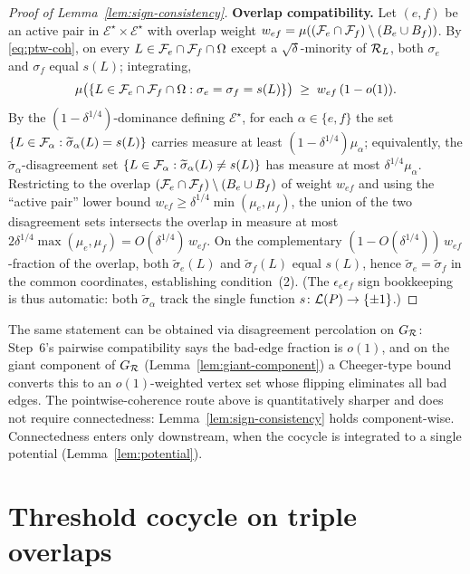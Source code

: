 \begin{proof}[Proof of Lemma~\ref{lem:sign-consistency}]
\textbf{Overlap compatibility.}
Let $(e,f)$ be an active pair in $\mathcal{E}^\star\times
\mathcal{E}^\star$ with overlap weight
$w_{ef}=\mu((\mathcal{F}_{e}\cap\mathcal{F}_{f})\setminus(B_e\cup B_f))$.
By \eqref{eq:ptw-coh}, on every $L\in\mathcal{F}_{e}\cap\mathcal{F}_{f}\cap\Omega$
except a $\sqrt{\delta}$-minority of $\mathcal{R}_L$, both $\sigma_e$ and
$\sigma_f$ equal $s(L)$; integrating,
\[
  \mu\bigl(\{L\in\mathcal{F}_{e}\cap\mathcal{F}_{f}\cap\Omega:
      \sigma_e=\sigma_f=s(L)\}\bigr)
  \;\ge\; w_{ef}\,(1-o(1)).
\]
By the $(1-\delta^{1/4})$-dominance defining $\mathcal{E}^\star$, for
each $\alpha\in\{e,f\}$ the set
$\{L\in\mathcal{F}_{\alpha}:\widetilde\sigma_\alpha(L)=s(L)\}$ carries
measure at least $(1-\delta^{1/4})\mu_\alpha$; equivalently, the
$\widetilde\sigma_\alpha$-disagreement set
$\{L\in\mathcal{F}_{\alpha}:\widetilde\sigma_\alpha(L)\ne s(L)\}$ has
measure at most $\delta^{1/4}\mu_\alpha$.  Restricting to the overlap
$(\mathcal{F}_{e}\cap\mathcal{F}_{f})\setminus(B_e\cup B_f)$ of weight
$w_{ef}$ and using the ``active pair'' lower bound
$w_{ef}\ge\delta^{1/4}\min(\mu_e,\mu_f)$, the union of the two
disagreement sets intersects the overlap in measure at most
$2\delta^{1/4}\max(\mu_e,\mu_f)=O(\delta^{1/4})\,w_{ef}$.  On the
complementary $(1-O(\delta^{1/4}))\,w_{ef}$-fraction of the overlap,
both $\widetilde\sigma_e(L)$ and $\widetilde\sigma_f(L)$ equal $s(L)$,
hence $\widetilde\sigma_e=\widetilde\sigma_f$ in the common
coordinates, establishing condition~(2).  (The $\epsilon_e\epsilon_f$
sign bookkeeping is thus automatic: both $\widetilde\sigma_\alpha$
track the single function $s\colon\mathcal{L}(P)\to\{\pm1\}$.)
\end{proof}

\begin{remark}
The same statement can be obtained via disagreement percolation on
$G_{\mathcal{R}}$: Step~6's pairwise compatibility says the bad-edge
fraction is $o(1)$, and on the giant component of $G_{\mathcal{R}}$
(Lemma~\ref{lem:giant-component}) a Cheeger-type bound converts this to
an $o(1)$-weighted vertex set whose flipping eliminates all bad edges.
The pointwise-coherence route above is quantitatively sharper and does
not require connectedness: Lemma~\ref{lem:sign-consistency} holds
component-wise.  Connectedness enters only downstream, when the
cocycle is integrated to a single potential
(Lemma~\ref{lem:potential}).
\end{remark}

\section{Threshold cocycle on triple overlaps}\label{sec:cocycle}


